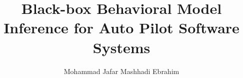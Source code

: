 \author{Mohammad Jafar Mashhadi Ebrahim}
\title{Black-box Behavioral Model Inference for Auto Pilot Software Systems}




\makethesistitle
